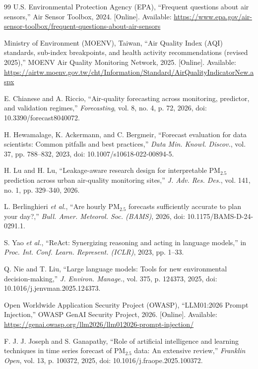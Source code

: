 \begin{thebibliography}{99}
U.S. Environmental Protection Agency (EPA), ``Frequent questions about air sensors,'' Air Sensor Toolbox, 2024. [Online]. Available: \url{https://www.epa.gov/air-sensor-toolbox/frequent-questions-about-air-sensors}

Ministry of Environment (MOENV), Taiwan, ``Air Quality Index (AQI) standards, sub-index breakpoints, and health activity recommendations (revised 2025),'' MOENV Air Quality Monitoring Network, 2025. [Online]. Available: \url{https://airtw.moenv.gov.tw/cht/Information/Standard/AirQualityIndicatorNew.aspx}

E. Chianese and A. Riccio, ``Air-quality forecasting across monitoring, predictor, and validation regimes,'' \emph{Forecasting}, vol. 8, no. 4, p. 72, 2026, doi: 10.3390/forecast8040072.

H. Hewamalage, K. Ackermann, and C. Bergmeir, ``Forecast evaluation for data scientists: Common pitfalls and best practices,'' \emph{Data Min. Knowl. Discov.}, vol. 37, pp. 788--832, 2023, doi: 10.1007/s10618-022-00894-5.

H. Lu and H. Lu, ``Leakage-aware research design for interpretable $\text{PM}_{2.5}$ prediction across urban air-quality monitoring sites,'' \emph{J. Adv. Res. Des.}, vol. 141, no. 1, pp. 329--340, 2026.

L. Berlinghieri \emph{et al.}, ``Are hourly $\text{PM}_{2.5}$ forecasts sufficiently accurate to plan your day?,'' \emph{Bull. Amer. Meteorol. Soc. (BAMS)}, 2026, doi: 10.1175/BAMS-D-24-0291.1.

S. Yao \emph{et al.}, ``ReAct: Synergizing reasoning and acting in language models,'' in \emph{Proc. Int. Conf. Learn. Represent. (ICLR)}, 2023, pp. 1--33.

Q. Nie and T. Liu, ``Large language models: Tools for new environmental decision-making,'' \emph{J. Environ. Manage.}, vol. 375, p. 124373, 2025, doi: 10.1016/j.jenvman.2025.124373.

Open Worldwide Application Security Project (OWASP), ``LLM01:2026 Prompt Injection,'' OWASP GenAI Security Project, 2026. [Online]. Available: \url{https://genai.owasp.org/llm2026/llm012026-prompt-injection/}

F. J. J. Joseph and S. Ganapathy, ``Role of artificial intelligence and learning techniques in time series forecast of $\text{PM}_{2.5}$ data: An extensive review,'' \emph{Franklin Open}, vol. 13, p. 100372, 2025, doi: 10.1016/j.fraope.2025.100372.


\end{thebibliography}

